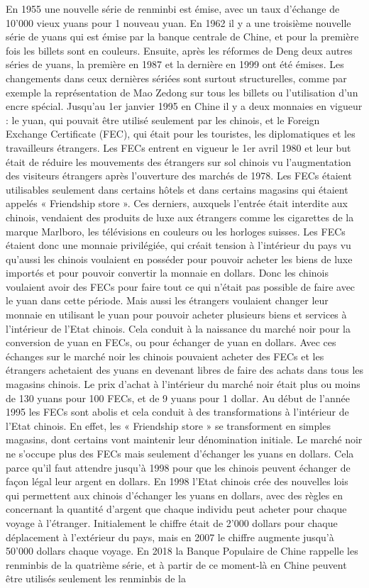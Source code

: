 En 1955 une nouvelle série de renminbi est émise, avec un taux d’échange de 10'000 vieux yuans pour 1 nouveau yuan.  En 1962 il y a une troisième nouvelle série de yuans qui est émise par la banque centrale de Chine, et pour la première fois les billets sont en couleurs. Ensuite, après les réformes de Deng deux autres séries de yuans, la première en 1987 et la dernière en 1999 ont été émises.  Les changements dans ceux dernières sériées sont surtout structurelles, comme par exemple la représentation de Mao Zedong sur tous les billets ou l’utilisation d’un encre spécial.  Jusqu’au 1er janvier 1995  en Chine il y a deux monnaies en vigueur :  le yuan, qui pouvait être utilisé seulement par les chinois, et le Foreign Exchange Certificate (FEC), qui était pour les touristes, les diplomatiques et les travailleurs étrangers.  Les FECs entrent en vigueur le 1er avril 1980 et leur but était de réduire les mouvements des étrangers sur sol chinois vu l’augmentation des visiteurs étrangers après l’ouverture des marchés de 1978. Les FECs étaient utilisables seulement dans certains hôtels et dans certains magasins qui étaient appelés « Friendship store ».  Ces derniers, auxquels l’entrée était interdite aux chinois, vendaient des produits de luxe aux étrangers comme les cigarettes de la marque Marlboro, les télévisions en couleurs ou les horloges suisses.  Les FECs étaient donc une monnaie privilégiée, qui créait tension à l’intérieur du pays vu qu’aussi les chinois voulaient en posséder pour pouvoir acheter les biens de luxe importés et pour pouvoir convertir la monnaie en dollars. Donc les chinois voulaient avoir des FECs pour faire tout ce qui n’était pas possible de faire avec le yuan dans cette période. Mais aussi les étrangers voulaient changer leur monnaie en utilisant le yuan pour pouvoir acheter plusieurs biens et services à l’intérieur de l’Etat chinois. Cela conduit à la naissance du marché noir pour la conversion de yuan en FECs, ou pour échanger de yuan en dollars. Avec ces échanges sur le marché noir les chinois pouvaient acheter des FECs et les étrangers achetaient des yuans en devenant libres de faire des achats dans tous les magasins chinois. Le prix d’achat à l’intérieur du marché noir était plus ou moins de 130 yuans pour 100 FECs, et de 9 yuans pour 1 dollar.  Au début de l’année 1995 les FECs sont abolis et cela conduit à des transformations à l’intérieur de l’Etat chinois. En effet, les « Friendship store » se transforment en simples magasins, dont certains vont maintenir leur dénomination initiale.  Le marché noir ne s’occupe plus des FECs mais seulement d’échanger les yuans en dollars. Cela parce qu’il faut attendre jusqu’à 1998 pour que les chinois peuvent échanger de façon légal leur argent en dollars.  En 1998 l’Etat chinois crée des nouvelles lois qui permettent aux chinois d’échanger les yuans en dollars, avec des règles en concernant la quantité d’argent que chaque individu peut acheter pour chaque voyage à l’étranger. Initialement le chiffre était de 2'000 dollars pour chaque déplacement à l’extérieur du pays, mais en 2007 le chiffre augmente jusqu’à 50'000 dollars chaque voyage.  En 2018 la Banque Populaire de Chine rappelle les renminbis de la quatrième série, et à partir de ce moment-là en Chine peuvent être utilisés seulement les renminbis de la 